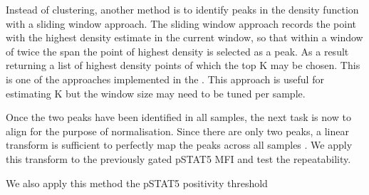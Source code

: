Instead of clustering, another method is to identify peaks in the density function with a sliding window approach.
The sliding window approach records the point with the highest density estimate in the current window, so that within a window of twice the span
the point of highest density is selected as a peak.
As a result returning a list of highest density points of which the top K may be chosen.
This is one of the approaches implemented in the .
This approach is useful for estimating K but the window size may need to be tuned per sample.


Once the two peaks have been identified in all samples, the next task is now to align for the purpose of normalisation.
Since there are only two peaks, a linear transform is sufficient to perfectly map the peaks across all samples .
We apply this transform to the previously gated pSTAT5 MFI and test the repeatability.

We also apply this method the pSTAT5 positivity threshold



